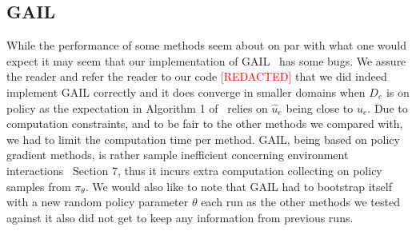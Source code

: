 \documentclass[10pt]{article}
\renewcommand{\cite}{\citep}
\theoremstyle{plain}
\theoremstyle{remark}
\newcommand{\gersi}[1]{\textcolor{red}{[#1]}}
\begin{document}
\subsection{GAIL}

While the performance of some methods seem about on par with what one would expect it may seem that our implementation of GAIL~\cite{Ho2016}
has some bugs. We assure the reader and refer the reader to our code \gersi{REDACTED} that we did indeed implement GAIL correctly and it does converge in smaller domains when $D_e$ is on policy as the expectation in Algorithm 1 of~\cite{Ho2016} relies on $\hat{u}_e$ being close to $u_e$. Due to computation constraints, and to be fair to the other methods we compared with, we had to limit the computation time per method. GAIL, being based on policy gradient methods, is rather sample inefficient concerning environment interactions~\cite{Ho2016} Section 7, thus it incurs extra computation collecting on policy samples from $\pi_\theta$. We would also like to note that GAIL had to bootstrap itself with a new random policy parameter $\theta$ each run as the other methods we tested against it also did not get to keep any information from previous runs.
    
    
    
    
\end{document}
